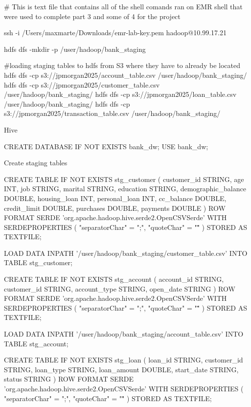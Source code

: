 


# This is text file that contains all of the shell comands ran on EMR shell that were used to complete part 3 and some of 4 for the project





ssh -i /Users/maxmarte/Downloads/emr-lab-key.pem hadoop@10.99.17.21


hdfs dfs -mkdir -p /user/hadoop/bank_staging

#loading staging tables to hdfs from S3 where they have to already be located
hdfs dfs -cp s3://jpmorgan2025/account_table.csv      /user/hadoop/bank_staging/
hdfs dfs -cp s3://jpmorgan2025/customer_table.csv     /user/hadoop/bank_staging/
hdfs dfs -cp s3://jpmorgan2025/loan_table.csv         /user/hadoop/bank_staging/
hdfs dfs -cp s3://jpmorgan2025/transaction_table.csv  /user/hadoop/bank_staging/


Hive

CREATE DATABASE IF NOT EXISTS bank_dw;
USE bank_dw;

Create staging tables

CREATE TABLE IF NOT EXISTS stg_customer (
  customer_id         STRING,
  age                 INT,
  job                 STRING,
  marital             STRING,
  education           STRING,
  demographic_balance DOUBLE,
  housing_loan        INT,
  personal_loan       INT,
  cc_balance          DOUBLE,
  credit_limit        DOUBLE,
  purchases           DOUBLE,
  payments            DOUBLE
)
ROW FORMAT SERDE 'org.apache.hadoop.hive.serde2.OpenCSVSerde'
WITH SERDEPROPERTIES (
  "separatorChar" = ";",
  "quoteChar"     = "\""
)
STORED AS TEXTFILE;

LOAD DATA INPATH '/user/hadoop/bank_staging/customer_table.csv'
INTO TABLE stg_customer;

CREATE TABLE IF NOT EXISTS stg_account (
  account_id   STRING,
  customer_id  STRING,
  account_type STRING,
  open_date    STRING
)
ROW FORMAT SERDE 'org.apache.hadoop.hive.serde2.OpenCSVSerde'
WITH SERDEPROPERTIES (
  "separatorChar" = ";",
  "quoteChar"     = "\""
)
STORED AS TEXTFILE;

LOAD DATA INPATH '/user/hadoop/bank_staging/account_table.csv'
INTO TABLE stg_account;

CREATE TABLE IF NOT EXISTS stg_loan (
  loan_id     STRING,
  customer_id STRING,
  loan_type   STRING,
  loan_amount DOUBLE,
  start_date  STRING,
  status      STRING
)
ROW FORMAT SERDE 'org.apache.hadoop.hive.serde2.OpenCSVSerde'
WITH SERDEPROPERTIES (
  "separatorChar" = ";",
  "quoteChar"     = "\""
)
STORED AS TEXTFILE;

